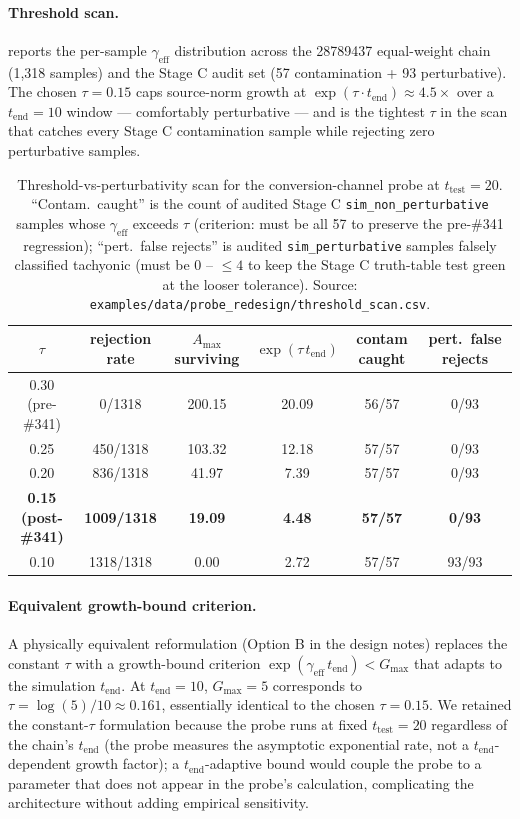 \paragraph{Threshold scan.}
 reports the per-sample $\gamma_{\text{eff}}$
distribution across the 28789437 equal-weight chain (1{,}318 samples)
and the Stage C audit set (57 contamination + 93 perturbative). The
chosen $\tau = 0.15$ caps source-norm growth at
$\exp(\tau \cdot t_{\text{end}}) \approx 4.5\times$ over a
$t_{\text{end}} = 10$ window --- comfortably perturbative --- and is
the tightest $\tau$ in the scan that catches every Stage C
contamination sample while rejecting zero perturbative samples.

\begin{table}[ht]
\centering
\begin{tabular}{cccccc}
\toprule
$\tau$ & rejection rate & $A_{\max}$ surviving & $\exp(\tau\, t_{\text{end}})$ & contam caught & pert.\ false rejects \\
\midrule
0.30 (pre-\#341) & 0/1318 & 200.15 & 20.09 & 56/57 & 0/93 \\
0.25 & 450/1318 & 103.32 & 12.18 & 57/57 & 0/93 \\
0.20 & 836/1318 & 41.97 & 7.39 & 57/57 & 0/93 \\
\textbf{0.15 (post-\#341)} & \textbf{1009/1318} & \textbf{19.09} & \textbf{4.48} & \textbf{57/57} & \textbf{0/93} \\
0.10 & 1318/1318 & 0.00 & 2.72 & 57/57 & 93/93 \\
\bottomrule
\end{tabular}
\caption{Threshold-vs-perturbativity scan for the conversion-channel
probe at $t_{\text{test}} = 20$. ``Contam.\ caught'' is the count of
audited Stage C \texttt{sim\_non\_perturbative} samples whose
$\gamma_{\text{eff}}$ exceeds $\tau$ (criterion: must be all 57 to
preserve the pre-\#341 regression); ``pert.\ false rejects'' is
audited \texttt{sim\_perturbative} samples falsely classified
tachyonic (must be 0 -- $\le 4$ to keep the Stage C truth-table test
green at the looser tolerance). Source: %
\texttt{examples/data/probe\_redesign/threshold\_scan.csv}.}
\label{tab:threshold-scan}
\end{table}

\paragraph{Equivalent growth-bound criterion.}
A physically equivalent reformulation (Option B in the design notes)
replaces the constant $\tau$ with a growth-bound criterion
$\exp(\gamma_{\text{eff}}\, t_{\text{end}}) < G_{\max}$ that adapts to
the simulation $t_{\text{end}}$. At $t_{\text{end}} = 10$, $G_{\max} =
5$ corresponds to $\tau = \log(5)/10 \approx 0.161$, essentially
identical to the chosen $\tau = 0.15$. We retained the constant-$\tau$
formulation because the probe runs at fixed $t_{\text{test}} = 20$
regardless of the chain's $t_{\text{end}}$ (the probe measures the
asymptotic exponential rate, not a $t_{\text{end}}$-dependent growth
factor); a $t_{\text{end}}$-adaptive bound would couple the probe to a
parameter that does not appear in the probe's calculation, complicating
the architecture without adding empirical sensitivity.

